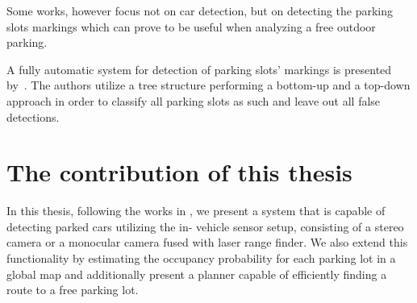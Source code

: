 Some works, however focus not on car detection, but on detecting the parking
slots markings which can prove to be useful when analyzing a free outdoor
parking.

A fully automatic system for detection of parking slots' markings is presented
by~\cite{suhr13}. The authors utilize a tree structure performing a bottom-up
and a top-down approach in order to classify all parking slots as such and
leave out all false detections.


\section{The contribution of this thesis} %
\label{sec:the_contribution_of_this_thesis}

In this thesis, following the works in , we
present a system that is capable of detecting parked cars utilizing the in-
vehicle sensor setup, consisting of a stereo camera or a monocular camera
fused with laser range finder. We also extend this functionality by estimating
the occupancy probability for each parking lot in a global map and
additionally present a planner capable of efficiently finding a route to a
free parking lot.


